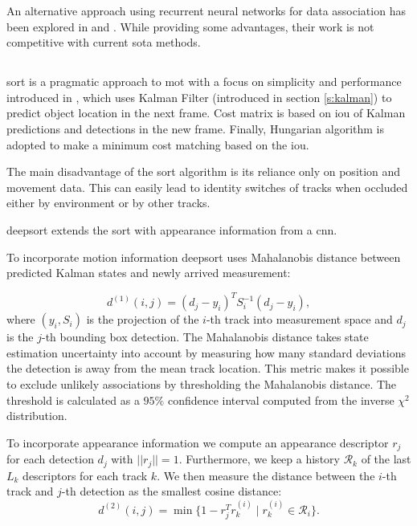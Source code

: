 An alternative approach using recurrent neural networks for data association has been explored in \cite{mot_with_rnn} and \cite{mot_with_longterm}. While providing some advantages, their work is not competitive with current \gls{sota} methods.\cite{MOT16}

\subsection{}\label{s:sort}

\Gls{sort} is a pragmatic approach to \gls{mot} with a focus on simplicity and performance introduced in \cite{Bewley_2016_SORT}, which uses Kalman Filter (introduced in section \ref{s:kalman}) to predict object location in the next frame. Cost matrix is based on \gls{iou}  of Kalman predictions and detections in the new frame. Finally, Hungarian algorithm\cite{kuhn1955hungarian} is adopted to make a minimum cost matching based on the \gls{iou}.

The main disadvantage of the \gls{sort} algorithm is its reliance only on position and movement data. This can easily lead to identity switches of tracks when occluded either by environment or by other tracks.

\Gls{deepsort} extends the \gls{sort} with appearance information from a \gls{cnn}.

To incorporate motion information \gls{deepsort} uses Mahalanobis distance between predicted Kalman states and newly arrived measurement:

$$
d^{(1)}(i,j) = (d_j - y_i)^T S_i^{-1}(d_j - y_i),
$$
where $(y_i, S_i)$ is the projection of the $i$-th track into measurement space and $d_j$ is the $j$-th bounding box detection. The Mahalanobis distance takes state estimation uncertainty into account by measuring how many standard deviations the detection is away from the mean track location. This metric makes it possible to exclude unlikely associations by thresholding the Mahalanobis distance. The threshold is calculated as a $95\%$ confidence interval computed from the inverse $\chi^2$ distribution.

To incorporate appearance information we compute an appearance descriptor $r_j$ for each detection $d_j$ with $||r_j|| = 1$. Furthermore, we keep a history $\mathcal{R}_k$ of the last $L_k$ descriptors for each track $k$. We then measure the distance between the $i$-th track and $j$-th detection as the smallest cosine distance:
$$
d^{(2)}(i,j) = \min\{1 - r_j^T r_k^{(i)}\; |\; r_k^{(i)} \in \mathcal{R}_i\}.
$$

